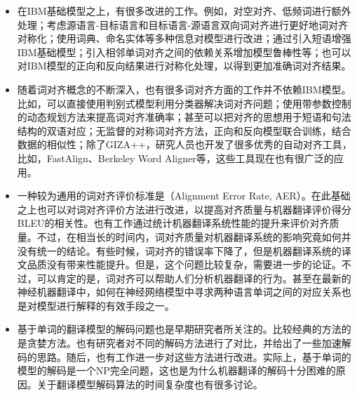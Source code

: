 \begin{itemize}
\vspace{0.5em}
\item 在IBM基础模型之上，有很多改进的工作。例如，对空对齐、低频词进行额外处理；考虑源语言-目标语言和目标语言-源语言双向词对齐进行更好地词对齐对称化；使用词典、命名实体等多种信息对模型进行改进；通过引入短语增强IBM基础模型；引入相邻单词对齐之间的依赖关系增加模型鲁棒性等；也可以对IBM模型的正向和反向结果进行对称化处理，以得到更加准确词对齐结果。

\item 随着词对齐概念的不断深入，也有很多词对齐方面的工作并不依赖IBM模型。比如，可以直接使用判别式模型利用分类器解决词对齐问题；使用带参数控制的动态规划方法来提高词对齐准确率；甚至可以把对齐的思想用于短语和句法结构的双语对应；无监督的对称词对齐方法，正向和反向模型联合训练，结合数据的相似性；除了GIZA++，研究人员也开发了很多优秀的自动对齐工具，比如，FastAlign、Berkeley Word Aligner等，这些工具现在也有很广泛的应用。

\vspace{0.5em}
\item 一种较为通用的词对齐评价标准是{}（Alignment Error Rate, AER）。在此基础之上也可以对词对齐评价方法进行改进，以提高对齐质量与机器翻译评价得分BLEU的相关性。也有工作通过统计机器翻译系统性能的提升来评价对齐质量。不过，在相当长的时间内，词对齐质量对机器翻译系统的影响究竟如何并没有统一的结论。有些时候，词对齐的错误率下降了，但是机器翻译系统的译文品质没有带来性能提升。但是，这个问题比较复杂，需要进一步的论证。不过，可以肯定的是，词对齐可以帮助人们分析机器翻译的行为。甚至在最新的神经机器翻译中，如何在神经网络模型中寻求两种语言单词之间的对应关系也是对模型进行解释的有效手段之一。

\vspace{0.5em}
\item 基于单词的翻译模型的解码问题也是早期研究者所关注的。比较经典的方法的是贪婪方法。也有研究者对不同的解码方法进行了对比，并给出了一些加速解码的思路。随后，也有工作进一步对这些方法进行改进。实际上，基于单词的模型的解码是一个NP完全问题，这也是为什么机器翻译的解码十分困难的原因。关于翻译模型解码算法的时间复杂度也有很多讨论。
\end{itemize}
